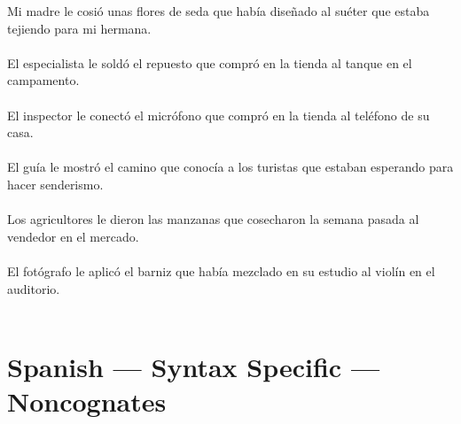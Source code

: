 Mi madre le cosió unas flores de seda que había diseñado al suéter que estaba tejiendo para mi hermana.	\\	\\
El especialista le soldó el repuesto que compró en la tienda al tanque en el campamento.	\\	\\
El inspector le conectó el micrófono que compró en la tienda al teléfono de su casa.	\\	\\
El guía le mostró el camino que conocía a los turistas que estaban esperando para hacer senderismo.	\\	\\
Los agricultores le dieron las manzanas que cosecharon la semana pasada al vendedor en el mercado.	\\	\\
El fotógrafo le aplicó el barniz que había mezclado en su estudio al violín en el auditorio.	\\	\\

\section{Spanish --- Syntax Specific --- Noncognates}

